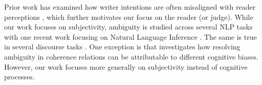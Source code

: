 Prior work has examined how writer intentions are often misaligned with reader perceptions \cite{Chang:2020}, which further motivates our focus on the reader (or judge). While our work focuses on subjectivity, ambiguity is studied across several NLP tasks with one recent work focusing on Natural Language Inference \cite{Pavlick:2019,Chen:2019}. The same is true in several discourse tasks \cite{Poesio:2019,Das:2017,Asher:2003,Versley:2011,Webber:2012,Webber:2019b}. One exception is  that investigates how resolving ambiguity in coherence relations can be attributable to different cognitive biases. However, our work focuses more generally on subjectivity instead of cognitive processes.   




